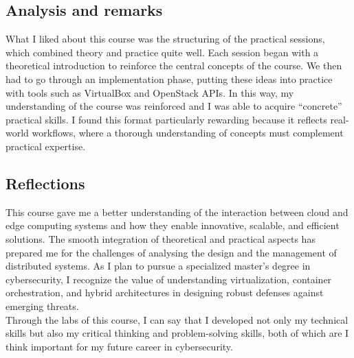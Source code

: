 \subsection{Analysis and remarks}
\indent \indent What I liked about this course was the structuring of the practical sessions, which combined theory and practice quite well. Each session began with a theoretical introduction to reinforce the central concepts of the course. We then had to go through an implementation phase, putting these ideas into practice with tools such as VirtualBox and OpenStack APIs. In this way, my understanding of the course was reinforced and I was able to acquire “concrete” practical skills. I found this format particularly rewarding because it reflects real-world workflows, where a thorough understanding of concepts must complement practical expertise.

\subsection{Reflections}
\indent \indent This course gave me a better understanding of the interaction between cloud and edge computing systems and how they enable innovative, scalable, and efficient solutions. The smooth integration of theoretical and practical aspects has prepared me for the challenges of analysing the design and the management of distributed systems. As I plan to pursue a specialized master's degree in cybersecurity, I recognize the value of understanding virtualization, container orchestration, and hybrid architectures in designing robust defenses against emerging threats.
\\

Through the labs of this course, I can say that I developed not only my technical skills but also my critical thinking and problem-solving skills, both of which are I think important for my future career in cybersecurity.